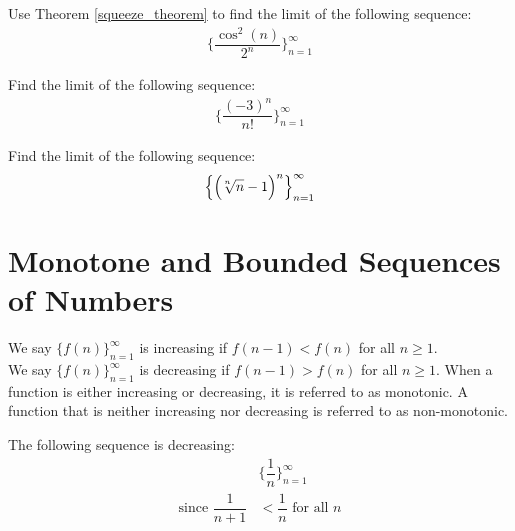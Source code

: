 \begin{exercise}
Use Theorem \ref{squeeze_theorem} to find the limit of the following sequence:
\begin{align*}
    \Big\{\dfrac{\cos^{2}(n)}{2^{n}}\Big\}_{n=1}^{\infty}
\end{align*}
\end{exercise}

\begin{exercise}
Find the limit of the following sequence:
\begin{align*}
    \Big\{\dfrac{(-3)^{n}}{n!}\Big\}_{n=1}^{\infty}
\end{align*}
\end{exercise}

\begin{exercise}
Find the limit of the following sequence:
\begin{align*}
    \Big\{\Big(\sqrt[\leftroot{2}\uproot{2}n]{n} - 1\Big)^{n}\Big\}_{n=1}^{\infty}
\end{align*}
\end{exercise}

\newpage
\section{Monotone and Bounded Sequences of Numbers}

\begin{definition}
We say $\{f(n)\}_{n=1}^{\infty}$ is increasing if $f(n-1) < f(n)$ for all $n \geq 1$.\\[1ex]
We say $\{f(n)\}_{n=1}^{\infty}$ is decreasing if $f(n-1) > f(n)$ for all $n \geq 1$. When a function is either increasing or decreasing, it is referred to as monotonic. A function that is neither increasing nor decreasing is referred to as non-monotonic.
\end{definition}

\begin{example}
The following sequence is decreasing:
\begin{align*}
    &\Big\{\dfrac{1}{n}\Big\}_{n=1}^{\infty}\\[2ex]
    \text{since} \hspace{4pt} \dfrac{1}{n+1} &< \dfrac{1}{n} \hspace{4pt} \text{for all} \hspace{4pt} n
\end{align*}
\end{example}

